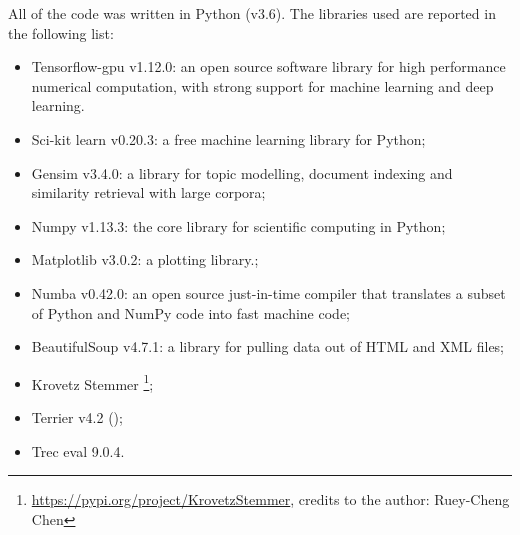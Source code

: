 All of the code was written in Python (v3.6). The libraries used are reported in the following list:

\begin{itemize}
 \item Tensorflow-gpu v1.12.0: an open source software library for high performance numerical computation, with strong support for machine learning and deep learning.
 \item Sci-kit learn v0.20.3: a free machine learning library for Python;
 \item Gensim v3.4.0: a library for topic modelling, document indexing and similarity retrieval with large corpora;
 \item Numpy v1.13.3: the core library for scientific computing in Python;
 \item Matplotlib v3.0.2: a plotting library.;
 \item Numba v0.42.0: an open source just-in-time compiler that translates a subset of Python and NumPy code into fast machine code;
 \item BeautifulSoup v4.7.1: a library for pulling data out of HTML and XML files;
 \item Krovetz Stemmer \footnote{\url{https://pypi.org/project/KrovetzStemmer}, credits to the author: Ruey-Cheng Chen};
 \item Terrier v4.2 (\cite{terrier});
 \item Trec eval 9.0.4.
\end{itemize}
